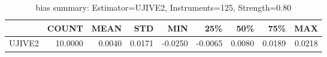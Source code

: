 \begin{table}[ht]
\centering
\caption{bias summary: Estimator=UJIVE2, Instruments=125, Strength=0.80}
\begin{tabular}{lrrrrrrrr}
\toprule
 & COUNT & MEAN & STD & MIN & 25\% & 50\% & 75\% & MAX \\
\midrule
UJIVE2 & 10.0000 & 0.0040 & 0.0171 & -0.0250 & -0.0065 & 0.0080 & 0.0189 & 0.0218 \\
\bottomrule
\end{tabular}
\end{table}
